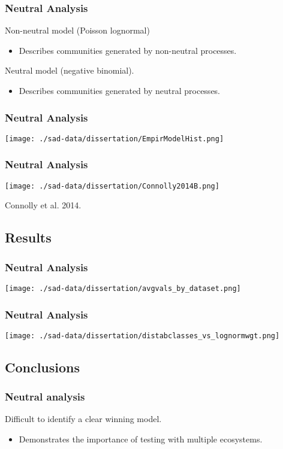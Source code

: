 \documentclass[14pt]{beamer}
\begin{document}
\begin{frame}{}
\frametitle{Neutral Analysis}
Non-neutral model (Poisson lognormal)\\
\begin{itemize}
\item Describes communities generated by non-neutral processes.
\end{itemize}
Neutral model (negative binomial).\\
\begin{itemize}
\item Describes communities generated by neutral processes.
\end{itemize}
\end{frame}

\begin{frame}{}
\frametitle{Neutral Analysis}
\texttt{[image: ./sad-data/dissertation/EmpirModelHist.png]}
\end{frame}

\begin{frame}{}
\frametitle{Neutral Analysis}
\begin{center}
\texttt{[image: ./sad-data/dissertation/Connolly2014B.png]}
\end{center}
\begin{tiny}
Connolly et al. 2014.
\end{tiny}
\end{frame}


\subsection{Results}
\begin{frame}{}
\frametitle{Neutral Analysis}
\texttt{[image: ./sad-data/dissertation/avgvals\_by\_dataset.png]}
\end{frame}

\begin{frame}{}
\frametitle{Neutral Analysis}
\texttt{[image: ./sad-data/dissertation/distabclasses\_vs\_lognormwgt.png]}
\end{frame}

\subsection{Conclusions}
\begin{frame}
\frametitle{Neutral analysis}
Difficult to identify a clear winning model.
\begin{itemize}
\item Demonstrates the importance of testing with multiple ecosystems.
\end{itemize}
\end{frame}
\end{document}
